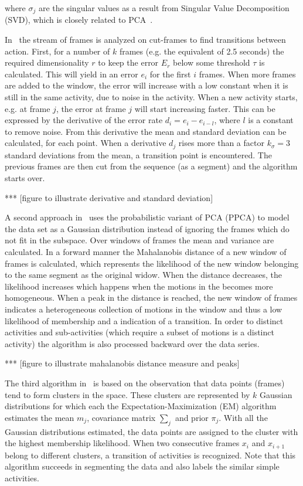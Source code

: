 where $\sigma_j$ are the singular values as a result from Singular Value Decomposition (SVD), which is closely related to PCA~\cite{shlens2005tutorial}.

In~\cite{barbivc2004segmenting} the stream of frames is analyzed on cut-frames to find transitions between action.
First, for a number of $k$ frames (e.g. the equivalent of 2.5 seconds) the required dimensionality $r$ to keep the error $E_r$ below some threshold $\tau$ is calculated.
This will yield in an error $e_i$ for the first $i$ frames.
When more frames are added to the window, the error will increase with a low constant when it is still in the same activity, due to noise in the activity.
When a new activity starts, e.g. at frame $j$, the error at frame $j$ will start increasing faster.
This can be expressed by the derivative of the error rate $d_i = e_i - e_{i-l}$, where $l$ is a constant to remove noise.
From this derivative the mean and standard deviation can be calculated, for each point.
When a derivative $d_j$ rises more than a factor $k_\sigma = 3$ standard deviations from the mean, a transition point is encountered.
The previous frames are then cut from the sequence (as a segment) and the algorithm starts over.

*** [figure to illustrate derivative and standard deviation]

A second approach in~\cite{barbivc2004segmenting} uses the probabilistic variant of PCA (PPCA) to model the data set as a Gaussian distribution instead of ignoring the frames which do not fit in the subspace.
Over windows of frames the mean and variance are calculated.
In a forward manner the Mahalanobis distance of a new window of frames is calculated, which represents the likelihood of the new window belonging to the same segment as the original widow.
When the distance decreases, the likelihood increases which happens when the motions in the becomes more homogeneous.
When a peak in the distance is reached, the new window of frames indicates a heterogeneous collection of motions in the window and thus a low likelihood of membership and a indication of a transition.
In order to distinct activities and sub-activities (which require a subset of motions is a distinct activity) the algorithm is also processed backward over the data series.

*** [figure to illustrate mahalanobis distance measure and peaks]

The third algorithm in~\cite{barbivc2004segmenting} is based on the observation that data points (frames) tend to form clusters in the space.
These clusters are represented by $k$ Gaussian distributions for which each the Expectation-Maximization (EM) algorithm estimates the mean $m_j$, covariance matrix $\sum_{j}$ and prior $\pi_j$.
With all the Gaussian distributions estimated, the data points are assigned to the cluster with the highest membership likelihood.
When two consecutive frames $x_i$ and $x_{i+1}$ belong to different clusters, a transition of activities is recognized.
Note that this algorithm succeeds in segmenting the data and also labels the similar simple activities.

